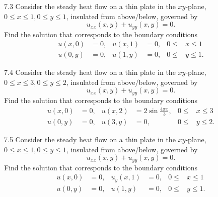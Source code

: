 \begin{problem}{7.3}
  Consider the steady heat flow on a thin plate in the $xy$-plane, $0 \leq x \leq 1, 0 \leq y \leq 1$, insulated from above/below, governed by
  \[ 
  u_{x x}(x,y) + u_{yy}(x,y) = 0
  .\]
  Find the solution that corresponds to the boundary conditions
  \begin{align*}
    u(x,0) &= 0, & u(x,1) &= 0, & 0 \leq& x \leq 1 \\
    u(0,y) &= 0, & u(1,y) &= 0, & 0 \leq& y \leq 1
  .\end{align*}
\end{problem}

\begin{problem}{7.4}
  Consider the steady heat flow on a thin plate in the $xy$-plane, $0 \leq x\leq 3, 0 \leq y \leq 2$, insulated from above/below, governed by
  \[ 
  u_{x x} (x,y) + u_{y y}(x,y) = 0 
  .\]
  Find the solution that corresponds to the boundary conditions
  \begin{align*}
    u(x,0) &= 0, & u(x,2) &= 2 \sin \frac{4 \pi x}{3}, & 0 \leq& x \leq 3 \\
    u(0,y) &= 0, & u(3,y) &= 0, & 0 \leq& y \leq 2
  .\end{align*}
\end{problem}

\begin{problem}{7.5}
  Consider the steady heat flow on a thin plate in the $xy$-plane, $0 \leq x\leq 1, 0 \leq y \leq 1$, insulated from above/below, governed by
  \[ 
  u_{x x} (x,y) + u_{y y}(x,y) = 0 
  .\]
  Find the solution that corresponds to the boundary conditions
  \begin{align*}
    u(x,0) &= 0, & u_y(x,1) &= 0, & 0 \leq& x \leq 1 \\
    u(0,y) &= 0, & u(1,y) &= 0, & 0 \leq& y \leq 1
  .\end{align*}
\end{problem}
